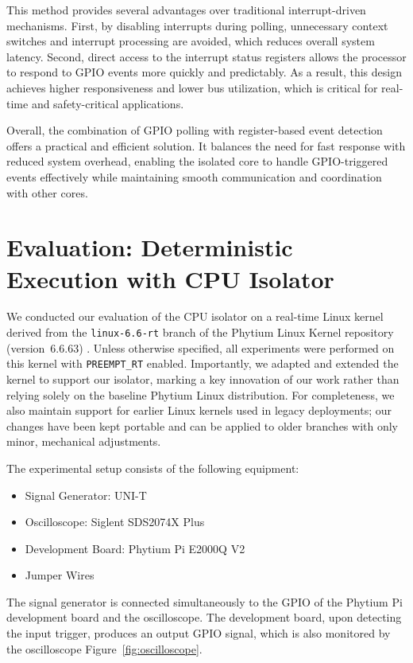 \documentclass[letterpaper]{article}
\begin{document}
This method provides several advantages over traditional interrupt-driven mechanisms. First,
by disabling interrupts during polling, unnecessary context switches and interrupt processing
are avoided, which reduces overall system latency. Second, direct access to the interrupt status
registers allows the processor to respond to GPIO events more quickly and predictably. As a result,
this design achieves higher responsiveness and lower bus utilization, which is critical for
real-time and safety-critical applications.

Overall, the combination of GPIO polling with register-based event detection offers a practical
and efficient solution. It balances the need for fast response with reduced system overhead,
enabling the isolated core to handle GPIO-triggered events effectively while maintaining smooth
communication and coordination with other cores.


\section{Evaluation: Deterministic Execution with CPU Isolator}


\label{sec:eval-iso}
We conducted our evaluation of the CPU isolator on a real-time Linux kernel 
derived from the \texttt{linux-6.6-rt} branch of the Phytium Linux Kernel 
repository (version~6.6.63) \cite{phytium-linux-6.6-rt}. Unless otherwise specified, 
all experiments were performed on this kernel with \texttt{PREEMPT\_RT} enabled. 
Importantly, we adapted and extended the kernel to support our isolator, marking 
a key innovation of our work rather than relying solely on the baseline Phytium 
Linux distribution. For completeness, we also maintain support for earlier Linux 
kernels used in legacy deployments; our changes have been kept portable and can 
be applied to older branches with only minor, mechanical adjustments.





The experimental setup consists of the following equipment:  
\begin{itemize}
  \item Signal Generator: UNI-T  
  \item Oscilloscope: Siglent SDS2074X Plus  
  \item Development Board: Phytium Pi E2000Q V2  
  \item Jumper Wires  
\end{itemize}

The signal generator is connected simultaneously to the GPIO of the Phytium Pi development board and the oscilloscope. The development board, upon detecting the input trigger, produces an output GPIO signal, which is also monitored by the oscilloscope Figure~\ref{fig:oscilloscope}.  
\end{document}
